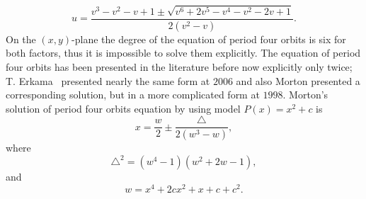 \documentclass[12pt,a4paper]{amsart}
\numberwithin{equation}{section}
\numberwithin{lause}{section}
\begin{document}
\begin{displaymath}
u=\frac{v^{3}-v^{2}-v+1\pm
\sqrt{v^{6}+2v^{5}-v^{4}-v^{2}-2v+1}}{2(v^{2}-v)}. \label{12}
\end{displaymath}
On the $(x,y)$-plane the degree of the equation of period four orbits is six for both factors, thus it is impossible to solve them explicitly.
The equation of period four orbits has been presented in the literature before now explicitly only twice; T. Erkama~\cite{1} presented nearly the same form at $2006$ and also Morton \cite{2} presented a corresponding solution, but in a more complicated form at $1998$. Morton's solution of period four orbits equation by using model $P(x)=x^{2}+c$ is
\begin{displaymath}
x=\frac{w}{2}\pm \frac{\triangle}{2(w^{3}-w)} ,
\end{displaymath}
where
\begin{displaymath}
\triangle^{2}=(w^{4}-1)(w^{2}+2w-1),
\end{displaymath}
and
\begin{displaymath}
w=x^{4}+2cx^{2}+x+c+c^{2}.
\end{displaymath}
\end{document}
